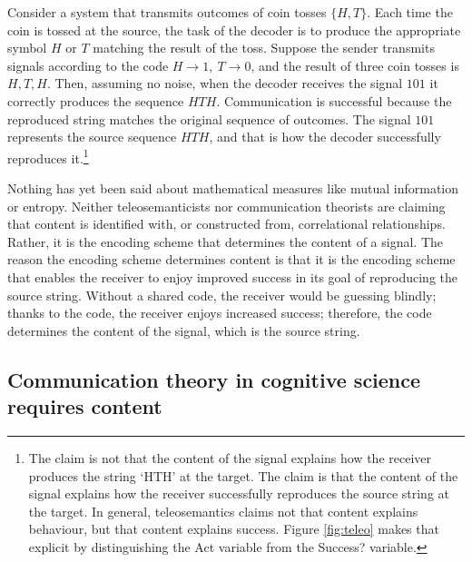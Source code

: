 \documentclass[12pt]{article}
\begin{document}
Consider a system that transmits outcomes of coin tosses $\{H,T\}$.
Each time the coin is tossed at the source, the task of the decoder is to produce the appropriate symbol $H$ or $T$ matching the result of the toss.
Suppose the sender transmits signals according to the code $H\rightarrow1,\ T\rightarrow0$, and the result of three coin tosses is $H, T, H$.
Then, assuming no noise, when the decoder receives the signal $101$ it correctly produces the sequence $HTH$.
Communication is successful because the reproduced string matches the original sequence of outcomes.
The signal $101$ represents the source sequence $HTH$, and that is how the decoder successfully reproduces it.\footnote{The claim is not that the content of the signal explains how the receiver produces the string `HTH' at the target. The claim is that the content of the signal explains how the receiver successfully reproduces the source string at the target. In general, teleosemantics claims not that content explains behaviour, but that content explains success. Figure \ref{fig:teleo} makes that explicit by distinguishing the Act variable from the Success? variable.}

Nothing has yet been said about mathematical measures like mutual information or entropy.
Neither teleosemanticists nor communication theorists are claiming that content is identified with, or constructed from, correlational relationships.
Rather, it is the encoding scheme that determines the content of a signal.
The reason the encoding scheme determines content is that it is the encoding scheme that enables the receiver to enjoy improved success in its goal of reproducing the source string.
Without a shared code, the receiver would be guessing blindly; thanks to the code, the receiver enjoys increased success; therefore, the code determines the content of the signal, which is the source string.

\subsection{Communication theory in cognitive science requires content}
\end{document}
